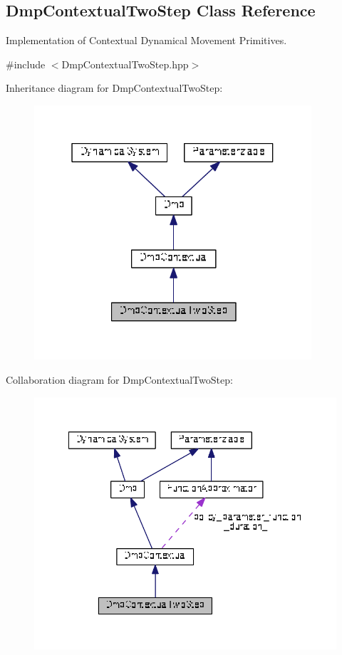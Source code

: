 \hypertarget{classDmpBbo_1_1DmpContextualTwoStep}{\subsection{Dmp\+Contextual\+Two\+Step Class Reference}
\label{classDmpBbo_1_1DmpContextualTwoStep}
}


Implementation of Contextual Dynamical Movement Primitives.  




{\ttfamily \#include $<$Dmp\+Contextual\+Two\+Step.\+hpp$>$}



Inheritance diagram for Dmp\+Contextual\+Two\+Step\+:
\nopagebreak
\begin{figure}[H]
\begin{center}
\leavevmode
\includegraphics[width=292pt]{classDmpBbo_1_1DmpContextualTwoStep__inherit__graph}
\end{center}
\end{figure}


Collaboration diagram for Dmp\+Contextual\+Two\+Step\+:
\nopagebreak
\begin{figure}[H]
\begin{center}
\leavevmode
\includegraphics[width=349pt]{classDmpBbo_1_1DmpContextualTwoStep__coll__graph}
\end{center}
\end{figure}
